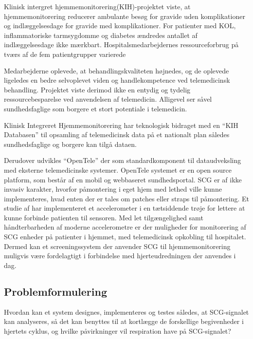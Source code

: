 	\textquotedbl Klinisk intergret hjemmemonitorering(KIH)-projektet viste, at hjemmemonitorering reducerer ambulante besøg for gravide uden komplikationer og indlæggelsesdage for gravide med komplikationer. For patienter med KOL, inflammatoriske tarmsygdomme og diabetes ændredes antallet af indlæggelsesdage ikke mærkbart. Hospitalsmedarbejdernes ressourceforbrug på tværs af de fem patientgrupper varierede\textquotedbl \cite{Lee2015} 


	\textquotedbl Medarbejderne oplevede, at behandlingskvaliteten højnedes, og de oplevede ligeledes en bedre selvoplevet viden og handlekompetence ved telemedicinsk behandling. Projektet viste derimod ikke en entydig og tydelig ressourcebesparelse ved anvendelsen af telemedicin. Alligevel ser såvel sundhedsfaglige som borgere et stort potentiale i telemedicin.\textquotedbl \cite{Lee2015}


Klinisk Integreret Hjemmemonitorering har teknologisk bidraget med en “KIH Databasen” til opsamling af telemedicinsk data på et nationalt plan således sundhedsfaglige og borgere kan tilgå dataen. 


Derudover udvikles “OpenTele” der som standardkomponent til dataudveksling med eksterne telemedicinske systemer. OpenTele systemet er en open source platform, som består af en mobil og webbaseret sundhedsportal.
\newpage
 SCG er af ikke invasiv karakter, hvorfor påmontering i eget hjem med lethed ville kunne implementeres, hvad enten der er tales om patches eller straps til påmontering. Et studie af \cite{Wearable} har implementeret et accelerometer i en tætsiddende trøje for lettere at kunne forbinde patienten til sensoren. Med let tilgængelighed samt håndterbarheden af moderne accelerometre  er der muligheder for monitorering af SCG enheder på patienter i hjemmet, med telemedicinsk opkobling til hospitalet. Dermed kan et screeningssystem der anvender SCG til hjemmemonitorering muligvis være fordelagtigt i forbindelse med hjerteudredningen der anvendes i dag.

\subsection{Problemformulering}
Hvordan kan et system designes, implementeres og testes således, at SCG-signalet kan  analyseres, så det kan benyttes til at kortlægge de forskellige begivenheder i hjertets cyklus, og hvilke påvirkninger vil respiration have på SCG-signalet?